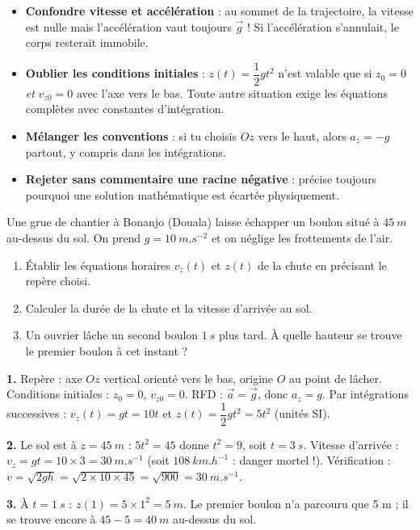\documentclass[11pt]{article}
\begin{document}
\begin{attention}
\begin{itemize}
\item \textbf{Confondre vitesse et accélération} : au sommet de la trajectoire, la vitesse est nulle mais l'accélération vaut toujours $\vec{g}$ ! Si l'accélération s'annulait, le corps resterait immobile.
\item \textbf{Oublier les conditions initiales} : $z(t) = \dfrac{1}{2}gt^2$ n'est valable que si $z_0 = 0$ \emph{et} $v_{z0} = 0$ avec l'axe vers le bas. Toute autre situation exige les équations complètes avec constantes d'intégration.
\item \textbf{Mélanger les conventions} : si tu choisis $Oz$ vers le haut, alors $a_z = -g$ partout, y compris dans les intégrations.
\item \textbf{Rejeter sans commentaire une racine négative} : précise toujours pourquoi une solution mathématique est écartée physiquement.
\end{itemize}
\end{attention}

\begin{exercice}
Une grue de chantier à Bonanjo (Douala) laisse échapper un boulon situé à $\SI{45}{m}$ au-dessus du sol. On prend $g = \SI{10}{m.s^{-2}}$ et on néglige les frottements de l'air.
\begin{enumerate}
\item Établir les équations horaires $v_z(t)$ et $z(t)$ de la chute en précisant le repère choisi.
\item Calculer la durée de la chute et la vitesse d'arrivée au sol.
\item Un ouvrier lâche un second boulon $\SI{1}{s}$ plus tard. À quelle hauteur se trouve le premier boulon à cet instant ?
\end{enumerate}
\end{exercice}

\begin{corrige}
\textbf{1.} Repère : axe $Oz$ vertical orienté vers le bas, origine $O$ au point de lâcher. Conditions initiales : $z_0 = 0$, $v_{z0} = 0$. RFD : $\vec{a} = \vec{g}$, donc $a_z = g$. Par intégrations successives : $v_z(t) = gt = 10t$ et $z(t) = \dfrac{1}{2}gt^2 = 5t^2$ (unités SI).

\textbf{2.} Le sol est à $z = \SI{45}{m}$ : $5t^2 = 45$ donne $t^2 = 9$, soit $t = \SI{3}{s}$. Vitesse d'arrivée : $v_z = gt = 10 \times 3 = \SI{30}{m.s^{-1}}$ (soit $\SI{108}{km.h^{-1}}$ : danger mortel !). Vérification : $v = \sqrt{2gh} = \sqrt{2 \times 10 \times 45} = \sqrt{900} = \SI{30}{m.s^{-1}}$.

\textbf{3.} À $t = \SI{1}{s}$ : $z(1) = 5 \times 1^2 = \SI{5}{m}$. Le premier boulon n'a parcouru que 5 m ; il se trouve encore à $45 - 5 = \SI{40}{m}$ au-dessus du sol.
\end{corrige}
\end{document}

